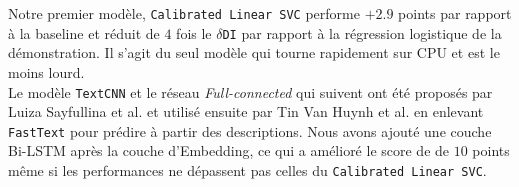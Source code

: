 Notre premier modèle, \texttt{Calibrated Linear SVC} performe $+2.9$ points par rapport à la baseline et réduit de $4$ fois le $\delta$\texttt{DI} par rapport à la régression logistique de la démonstration. Il s'agit du seul modèle qui tourne rapidement sur CPU et est le moins lourd.
\hfill\\

Le modèle \texttt{TextCNN} et le réseau \textit{Full-connected} qui suivent ont été proposés par Luiza Sayfullina et al. et utilisé ensuite par Tin Van Huynh et al. en enlevant \texttt{FastText} pour prédire à partir des descriptions. Nous avons ajouté une couche Bi-LSTM après la couche d'Embedding, ce qui a amélioré le score de de $10$ points même si les performances ne dépassent pas celles du \texttt{Calibrated Linear SVC}.

